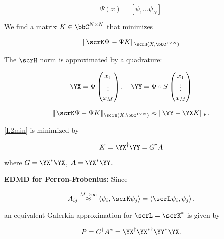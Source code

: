 \begin{equation}
    \Psi (x) = \left[ \psi_1 \ldots \psi_N \right]
\end{equation}

We find a matrix $K \in \bbC^{N \times N}$ that minimizes

\begin{equation}
    \label{L2min}
    \| \scrK \Psi - \Psi K \|_{\scrH (X, \bbC^{1 \times N})}
\end{equation}

The $\scrH$ norm is approximated by a quadrature:

\begin{equation}
    \YX = \Psi 
        \begin{pmatrix}
            x_1 \\
            \vdots \\
            x_M
        \end{pmatrix}
    , \quad
    \YY = \Psi \circ S 
        \begin{pmatrix}
            x_1 \\
            \vdots \\
            x_M
        \end{pmatrix}
\end{equation}

\begin{equation}
    \label{l2min}
    \| \scrK \Psi - \Psi K \|_{\scrH (X, \bbC^{1 \times N})}
    \approx
    \| \YY - \YX K \|_F . 
\end{equation}

\ref{L2min} is minimized by 

\begin{equation}
    K = \YX^\dagger \YY = G^\dagger A
\end{equation}

where $G = \YX^* \YX$, $A = \YX^* \YY$. 

\textbf{EDMD for Perron-Frobenius:} Since

\begin{equation}
    A_{i j} \stackrel{M \to \infty}{\approx} \left\langle \psi_i, \scrK \psi_j 
    \right\rangle = 
    \left\langle \scrL \psi_i, \psi_j \right\rangle, 
\end{equation}

an equivalent Galerkin approximation for $\scrL = \scrK^*$ is given by

\begin{equation}
    P = G^\dagger A^* = \YX^\dagger {\YX^*}^\dagger \YY^* \YX . 
\end{equation}

